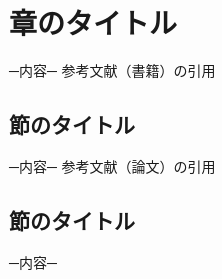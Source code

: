 ﻿\chapter{章のタイトル}
─内容─
参考文献（書籍）の引用\cite{book1}
\section{節のタイトル}
─内容─
参考文献（論文）の引用\cite{paper1}
\section{節のタイトル}
─内容─

